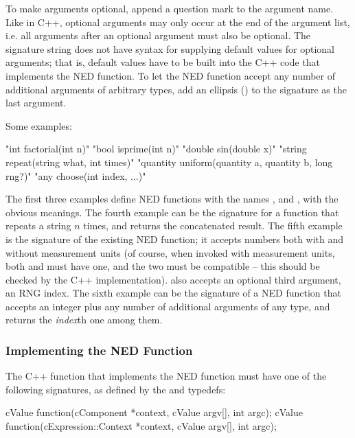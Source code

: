 To make arguments optional, append a question mark to the argument name.
Like in C++, optional arguments may only occur at the end of the argument
list, i.e. all arguments after an optional argument must also be optional.
The signature string does not have syntax for supplying default values for
optional arguments; that is, default values have to be built into the C++
code that implements the NED function. To let the NED function accept any
number of additional arguments of arbitrary types, add an ellipsis
() to the signature as the last argument.

Some examples:

\begin{cpp}
"int factorial(int n)"
"bool isprime(int n)"
"double sin(double x)"
"string repeat(string what, int times)"
"quantity uniform(quantity a, quantity b, long rng?)"
"any choose(int index, ...)"
\end{cpp}

The first three examples define NED functions with the names ,
 and , with the obvious meanings. The fourth example
can be the signature for a function that repeats a string $n$ times, and
returns the concatenated result. The fifth example is the signature of the
existing  NED function; it accepts numbers both with and without
measurement units (of course, when invoked with measurement units, both 
and  must have one, and the two must be compatible -- this should be checked
by the C++ implementation).  also accepts an optional third argument,
an RNG index. The sixth example can be the signature of a 
NED function that accepts an integer plus any number of additional arguments
of any type, and returns the \textit{index}th one among them.

\subsubsection{Implementing the NED Function}
\label{sec:sim-lib:implementing-ned-function}

The C++ function that implements the NED function must have one of the following
signatures, as defined by the  and  typedefs:

\begin{cpp}
cValue function(cComponent *context, cValue argv[], int argc);
cValue function(cExpression::Context *context, cValue argv[], int argc);
\end{cpp}

